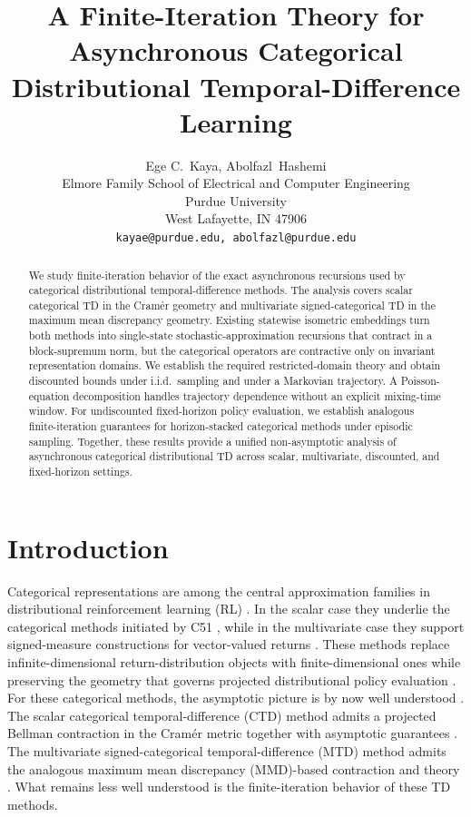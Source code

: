 \documentclass{article}
\title{A Finite-Iteration Theory for Asynchronous Categorical Distributional Temporal-Difference Learning}
\author{Ege C.~Kaya, Abolfazl~Hashemi  \\
  Elmore Family School of Electrical and Computer Engineering\\
  Purdue University\\
  West Lafayette, IN 47906 \\
  \texttt{kayae@purdue.edu, abolfazl@purdue.edu}}
\begin{document}
\maketitle

\begin{abstract}
We study finite-iteration behavior of the exact asynchronous recursions used by categorical distributional temporal-difference methods. The analysis covers scalar categorical TD in the Cram\'er geometry and multivariate signed-categorical TD in the maximum mean discrepancy geometry. Existing statewise isometric embeddings turn both methods into single-state stochastic-approximation recursions that contract in a block-supremum norm, but the categorical operators are contractive only on invariant representation domains. We establish the required restricted-domain theory and obtain discounted bounds under i.i.d.\ sampling and under a Markovian trajectory. A Poisson-equation decomposition handles trajectory dependence without an explicit mixing-time window. For undiscounted fixed-horizon policy evaluation, we establish analogous finite-iteration guarantees for horizon-stacked categorical methods under episodic sampling. Together, these results provide a unified non-asymptotic analysis of asynchronous categorical distributional TD across scalar, multivariate, discounted, and fixed-horizon settings.
\end{abstract}

\section{Introduction}
Categorical representations are among the central approximation families in distributional reinforcement learning (RL) \citep{bellemare2017distributional,rowland2018analysis,dabney2018distributional,dabney2018implicit,yang2019fully,lyle2019comparative,rowland2019statistics,bellemare2023distributional}. In the scalar case they underlie the categorical methods initiated by C51 \citep{bellemare2017distributional}, while in the multivariate case they support signed-measure constructions for vector-valued returns \citep{wiltzer2024foundations}. These methods replace infinite-dimensional return-distribution objects with finite-dimensional ones while preserving the geometry that governs projected distributional policy evaluation \citep{howard1972risk,jaquette1973markov,jaquette1976utility,sobel1982variance,morimura2010nonparametric}. For these categorical methods, the asymptotic picture is by now well understood \citep{gurvits1994incremental, dayan1994td, tsitsiklis1994asynchronous, jaakkola1993convergence, bertsekas1996neuro, littman1996generalized, rowland2018analysis,bellemare2023distributional}. The scalar categorical temporal-difference (CTD) method admits a projected Bellman contraction in the Cram\'er metric together with asymptotic guarantees \citep{rowland2018analysis,bellemare2023distributional}. The multivariate signed-categorical temporal-difference (MTD) method admits the analogous maximum mean discrepancy (MMD)-based contraction and theory \citep{wiltzer2024foundations}. What remains less well understood is the finite-iteration behavior of these TD methods.
\end{document}
